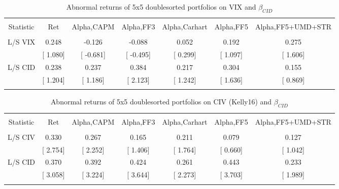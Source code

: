 \documentclass[16pt]{article}
\begin{document}
\begin{table}[!htbp] \centering 
  \caption{Abnormal returns of 5x5 doublesorted portfolios on VIX and $\beta_{CID}$} 
  \label{} 
\begin{tabular}{@{\extracolsep{5pt}} ccccccc} 
\\[-1.8ex]\hline 
\hline \\[-1.8ex] 
Statistic & Ret & Alpha,CAPM & Alpha,FF3 & Alpha,Carhart & Alpha,FF5 & Alpha,FF5+UMD+STR \\ 
\hline \\[-1.8ex] 
L/S VIX & 0.248 & -0.126 & -0.088 & 0.052 & 0.192 & 0.275 \\ 
& [ 1.080] & [ -0.681] & [ -0.495] & [ 0.299] & [ 1.097] & [ 1.606] \\ 
L/S CID & 0.238 & 0.237 & 0.384 & 0.217 & 0.304 & 0.155 \\ 
& [ 1.204] & [ 1.186] & [ 2.123] & [ 1.242] & [ 1.636] & [ 0.869] \\ 
\hline \\[-1.8ex] 
\end{tabular} 
\end{table}



\begin{table}[!htbp] \centering 
  \caption{Abnormal returns of 5x5 doublesorted portfolios on CIV (Kelly16) and $\beta_{CID}$} 
  \label{} 
\begin{tabular}{@{\extracolsep{5pt}} ccccccc} 
\\[-1.8ex]\hline 
\hline \\[-1.8ex] 
Statistic & Ret & Alpha,CAPM & Alpha,FF3 & Alpha,Carhart & Alpha,FF5 & Alpha,FF5+UMD+STR \\ 
\hline \\[-1.8ex] 
L/S CIV & 0.330 & 0.267 & 0.165 & 0.211 & 0.079 & 0.127 \\ 
& [ 2.754] & [ 2.252] & [ 1.406] & [ 1.764] & [ 0.660] & [ 1.042] \\ 
L/S CID & 0.370 & 0.392 & 0.424 & 0.261 & 0.443 & 0.233 \\ 
& [ 3.058] & [ 3.224] & [ 3.644] & [ 2.273] & [ 3.703] & [ 1.989] \\ 
\hline \\[-1.8ex] 
\end{tabular} 
\end{table}
\end{document}
